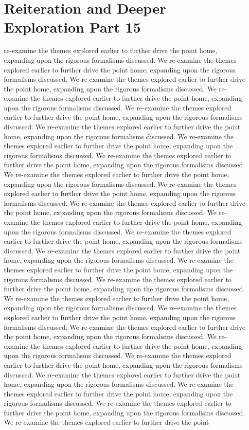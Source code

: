 \section{Reiteration and Deeper Exploration Part 15}\nWe re-examine the themes explored earlier to further drive the point home, expanding upon the rigorous formalisms discussed. We re-examine the themes explored earlier to further drive the point home, expanding upon the rigorous formalisms discussed. We re-examine the themes explored earlier to further drive the point home, expanding upon the rigorous formalisms discussed. We re-examine the themes explored earlier to further drive the point home, expanding upon the rigorous formalisms discussed. We re-examine the themes explored earlier to further drive the point home, expanding upon the rigorous formalisms discussed. We re-examine the themes explored earlier to further drive the point home, expanding upon the rigorous formalisms discussed. We re-examine the themes explored earlier to further drive the point home, expanding upon the rigorous formalisms discussed. We re-examine the themes explored earlier to further drive the point home, expanding upon the rigorous formalisms discussed. We re-examine the themes explored earlier to further drive the point home, expanding upon the rigorous formalisms discussed. We re-examine the themes explored earlier to further drive the point home, expanding upon the rigorous formalisms discussed. We re-examine the themes explored earlier to further drive the point home, expanding upon the rigorous formalisms discussed. We re-examine the themes explored earlier to further drive the point home, expanding upon the rigorous formalisms discussed. We re-examine the themes explored earlier to further drive the point home, expanding upon the rigorous formalisms discussed. We re-examine the themes explored earlier to further drive the point home, expanding upon the rigorous formalisms discussed. We re-examine the themes explored earlier to further drive the point home, expanding upon the rigorous formalisms discussed. We re-examine the themes explored earlier to further drive the point home, expanding upon the rigorous formalisms discussed. We re-examine the themes explored earlier to further drive the point home, expanding upon the rigorous formalisms discussed. We re-examine the themes explored earlier to further drive the point home, expanding upon the rigorous formalisms discussed. We re-examine the themes explored earlier to further drive the point home, expanding upon the rigorous formalisms discussed. We re-examine the themes explored earlier to further drive the point home, expanding upon the rigorous formalisms discussed. We re-examine the themes explored earlier to further drive the point home, expanding upon the rigorous formalisms discussed. We re-examine the themes explored earlier to further drive the point home, expanding upon the rigorous formalisms discussed. We re-examine the themes explored earlier to further drive the point home, expanding upon the rigorous formalisms discussed. We re-examine the themes explored earlier to further drive the point home, expanding upon the rigorous formalisms discussed. We re-examine the themes explored earlier to further drive the point 